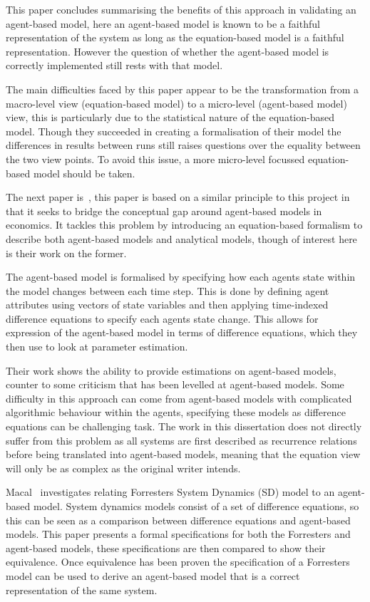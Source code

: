 \documentclass{article}
\begin{document}
This paper concludes summarising the benefits of this approach in validating an agent-based model, here an agent-based model is known to be a faithful representation of the system as long as the equation-based model is a faithful representation. However the question of whether the agent-based model is correctly implemented still rests with that model. 

The main difficulties faced by this paper appear to be the transformation from a macro-level view (equation-based model) to a micro-level (agent-based model) view, this is particularly due to the statistical nature of the equation-based model. Though they succeeded in creating a formalisation of their model the differences in results between runs still raises questions over the equality between the two view points. To avoid this issue, a more micro-level focussed equation-based model should be taken.

The next paper is~\cite{econmistsnoabm}, this paper is based on a similar principle to this project in that it seeks to bridge the conceptual gap around  agent-based models in economics. It tackles this problem by introducing an equation-based formalism to describe both agent-based models and analytical models, though of interest here is their work on the former. 

The agent-based model is formalised by specifying how each agent\textsc{}s state within the model changes between each time step. This is done by defining agent attributes using vectors of state variables and then applying time-indexed difference equations to specify each agents state change. This allows for expression of the agent-based model in terms of difference equations, which they then use to look at parameter estimation. 

Their work shows the ability to provide estimations on agent-based models, counter to some criticism that has been levelled at agent-based models. Some difficulty in this approach can come from agent-based models with complicated algorithmic behaviour within the agents, specifying these models as difference equations can be challenging task. The work in this dissertation does not directly suffer from this problem as all systems are first described as recurrence relations before being translated into agent-based models, meaning that the equation view will only be as complex as the original writer intends.  

Macal~\cite{abmtsd} investigates relating Forrester\textsc{}s System Dynamics (SD) model to an agent-based model. System dynamics models consist of a set of difference equations, so this can be seen as a comparison between difference equations and agent-based models. This paper presents a formal specifications for both the Forrester\textsc{}s and agent-based models, these specifications are then compared to show their equivalence. Once equivalence has been proven the specification of a Forrester\textsc{}s model can be used to derive an agent-based model that is a correct representation of the same system.
\end{document}
